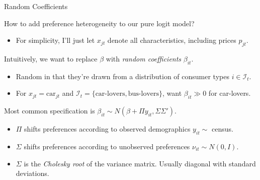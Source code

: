 \documentclass[aspectratio=169,t,11pt,table]{beamer}
\begin{document}
\begin{frame}{Random Coefficients}
    \vspace{-\baselineskip}
    \begin{minipage}[c][4\baselineskip][c]{\textwidth}
    \end{minipage}
    \vspace{-0.5\baselineskip}
    \begin{wideitemize}
        \item How to add preference heterogeneity to our pure logit model?
        \begin{itemize}
            \item For simplicity, I'll just let $x_{jt}$ denote all characteristics, including prices $p_{jt}$.
        \end{itemize}
        \pause
        \item Intuitively, we want to replace $\beta$ with \textit{random coefficients} \alert{$\beta_{it}$}.
        \begin{itemize}
            \item Random in that they're drawn from a distribution of consumer types $i \in \mathcal{I}_t$.
            \item For $x_{jt} = \text{car}_{jt}$ and $\mathcal{I}_t = \{\text{car-lovers}, \text{bus-lovers}\}$, want $\beta_{it} \gg 0$ for car-lovers.
        \end{itemize}
        \pause
        \item Most common specification is $\beta_{it} \sim N(\beta + \Pi y_{it}, \Sigma\Sigma')$.
        \begin{itemize}
            \item $\Pi$ shifts preferences according to observed demographics $y_{it} \sim $ census.
            \item $\Sigma$ shifts preferences according to unobserved preferences $\nu_{it} \sim N(0, I)$.
            \item $\Sigma$ is the \textit{Cholesky root} of the variance matrix. Usually diagonal with standard deviations.
        \end{itemize}
    \end{wideitemize}
\end{frame}
\end{document}
